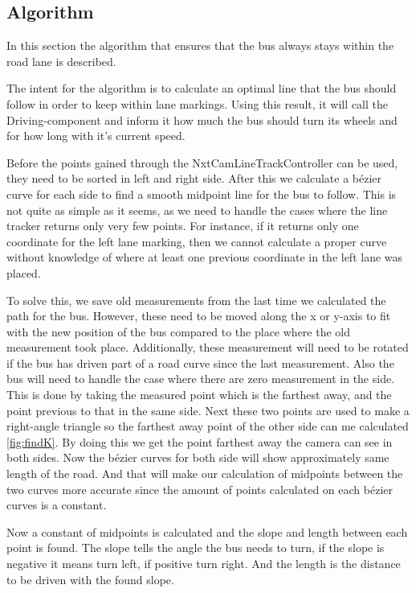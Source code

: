 \subsection{Algorithm}
In this section the algorithm that ensures that the bus always stays within the road lane is described. 

The intent for the algorithm is to calculate an optimal line that the bus should follow in order to keep within lane markings. Using this result, it will call the Driving-component and inform it how much the bus should turn its wheels and for how long with it's current speed. 

Before the points gained through the NxtCamLineTrackController can be used, they need to be sorted in left and right side. After this we calculate a bézier curve for each side to find a smooth midpoint line for the bus to follow. This is not quite as simple as it seems, as we need to handle the cases where the line tracker returns only very few points. For instance, if it returns only one coordinate for the left lane marking, then we cannot calculate a proper curve without knowledge of where at least one previous coordinate in the left lane was placed. 

To solve this, we save old measurements from the last time we calculated the path for the bus. However, these need to be moved along the x or y-axis to fit with the new position of the bus compared to the place where the old measurement took place. Additionally, these measurement will need to be rotated if the bus has driven part of a road curve since the last measurement. Also the bus will need to handle the case where there are zero measurement in the side. This is done by taking the measured point which is the farthest away, and the point previous to that in the same side. Next these two points are used to make a right-angle triangle so the farthest away point of the other side can me calculated \ref{fig:findK}. By doing this we get the point farthest away the camera can see in both sides. Now the bézier curves for both side will show approximately same length of the road. And that will make our calculation of midpoints between the two curves more accurate since the amount of points calculated on each bézier curves is a constant.

Now a constant of midpoints is calculated and the slope and length between each point is found. The slope tells the angle the bus needs to turn, if the slope is negative it means turn left, if positive turn right. And the length is the distance to be driven with the found slope. 


